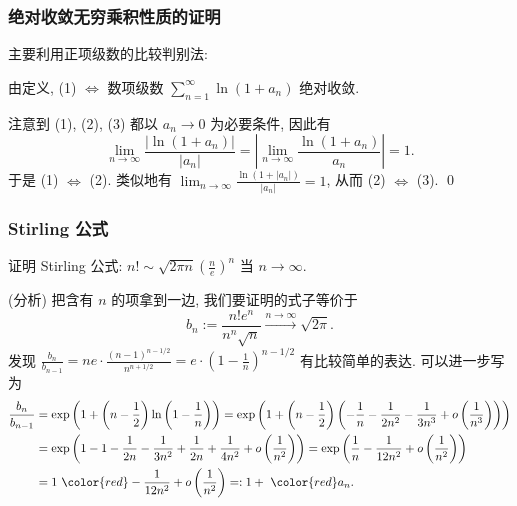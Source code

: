
\begin{frame}
\frametitle{绝对收敛无穷乘积性质的证明}

主要利用正项级数的比较判别法:

由定义, (1) $\Longleftrightarrow$ 数项级数 $\sum_{n=1}^\infty \ln (1 + a_n)$ 绝对收敛.

注意到 (1), (2), (3) 都以 $a_n \to 0$ 为必要条件, 因此有
\[
\lim_{n \to \infty} \frac{|\ln (1 + a_n)|}{|a_n|} = \left| \lim_{n \to \infty} \frac{\ln (1 + a_n)}{a_n} \right| = 1.
\]
于是 (1) $\Longleftrightarrow$ (2).
\pause
类似地有 $\lim_{n \to \infty} \frac{\ln (1 + |a_n|)}{|a_n|} = 1$, 从而 (2) $\Longleftrightarrow$ (3).
\qed

\end{frame}


\begin{frame}
\frametitle{Stirling 公式}

\begin{eg}
证明 Stirling 公式: $n! \sim \sqrt{2\pi n} \left( \frac{n}{e} \right)^n$ 当 $n \to \infty$.
\end{eg}

\pause

\startproof[bg=yellow, fg=red](分析)
把含有 $n$ 的项拿到一边, 我们要证明的式子等价于
\[
b_n := \frac{n! e^n}{n^n \sqrt{n}} \xrightarrow[]{n \to \infty} \sqrt{2\pi}.
\]
\pause
发现 $\frac{b_n}{b_{n-1}} = ne \cdot \frac{(n-1)^{n-1/2}}{n^{n+1/2}} = e \cdot \left( 1 - \frac{1}{n} \right)^{n-1/2}$ 有比较简单的表达. 可以进一步写为
\begin{align*}
\frac{b_n}{b_{n-1}} & = \exp \left( 1 + \left(n - \frac{1}{2}\right) \ln \left( 1 - \frac{1}{n} \right) \right)
= \exp \left( 1 + \left(n - \frac{1}{2}\right) \left( -\frac{1}{n} - \frac{1}{2n^2} - \frac{1}{3n^3} + o\left(\frac{1}{n^3}\right) \right) \right) \\
& = \exp \left( 1 - 1 - \frac{1}{2n} - \frac{1}{3n^2} + \frac{1}{2n} + \frac{1}{4n^2} + o\left(\frac{1}{n^2}\right) \right) = \exp \left( \frac{1}{n} - \frac{1}{12n^2} + o\left(\frac{1}{n^2}\right) \right) \\
& = 1 ~ {\color{red} - \frac{1}{12n^2} + o\left(\frac{1}{n^2}\right)} =: 1 +  ~ {\color{red} a_n}.
\end{align*}

\end{frame}

